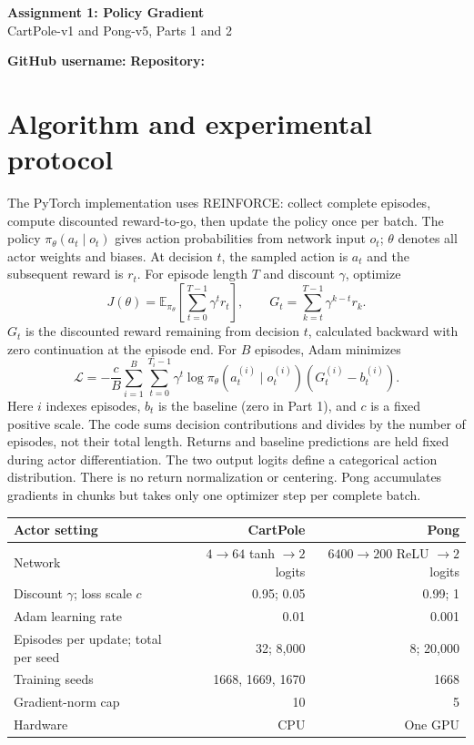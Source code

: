 \documentclass[11pt,letterpaper]{article}
\begin{document}
\begin{center}{\Large\bfseries Assignment 1: Policy Gradient}\\[3pt]
CartPole-v1 and Pong-v5, Parts 1 and 2\end{center}
\textbf{GitHub username:} \GithubUsername\quad\textbf{Repository:} \RepositoryName\\
\RepositoryLink

\section{Algorithm and experimental protocol}
The PyTorch implementation uses REINFORCE: collect complete episodes, compute discounted reward-to-go, then update the policy once per batch. The policy $\pi_\theta(a_t\mid o_t)$ gives action probabilities from network input $o_t$; $\theta$ denotes all actor weights and biases. At decision $t$, the sampled action is $a_t$ and the subsequent reward is $r_t$. For episode length $T$ and discount $\gamma$, optimize
\[
J(\theta)=\mathbb E_{\pi_\theta}\!\left[\sum_{t=0}^{T-1}\gamma^t r_t\right],
\qquad G_t=\sum_{k=t}^{T-1}\gamma^{k-t}r_k.
\]
$G_t$ is the discounted reward remaining from decision $t$, calculated backward with zero continuation at the episode end. For $B$ episodes, Adam minimizes
\[
\mathcal L=-\frac{c}{B}\sum_{i=1}^{B}\sum_{t=0}^{T_i-1}
\gamma^t\log\pi_\theta(a_t^{(i)}\mid o_t^{(i)})(G_t^{(i)}-b_t^{(i)}).
\]
Here $i$ indexes episodes, $b_t$ is the baseline (zero in Part 1), and $c$ is a fixed positive scale. The code sums decision contributions and divides by the number of episodes, not their total length. Returns and baseline predictions are held fixed during actor differentiation. The two output logits define a categorical action distribution. There is no return normalization or centering. Pong accumulates gradients in chunks but takes only one optimizer step per complete batch.

\begin{center}\small
\begin{tabular}{lrr}\toprule
Actor setting & CartPole & Pong\\\midrule
Network & $4\to64$ tanh $\to2$ logits & $6400\to200$ ReLU $\to2$ logits\\
Discount $\gamma$; loss scale $c$ & 0.95; 0.05 & 0.99; 1\\
Adam learning rate & 0.01 & 0.001\\
Episodes per update; total per seed & 32; 8,000 & 8; 20,000\\
Training seeds & 1668, 1669, 1670 & 1668\\
Gradient-norm cap & 10 & 5\\
Hardware & CPU & One GPU\\\bottomrule
\end{tabular}\end{center}
\end{document}
